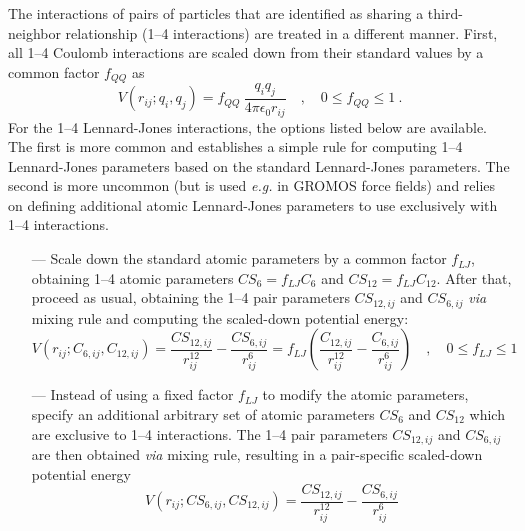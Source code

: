 \documentclass[10pt,a4paper,openany]{memoir}
\numberwithin{equation}{section}
\begin{document}
The interactions of pairs of particles that are identified as sharing
a third-neighbor relationship (1--4 interactions) are treated in a
different manner. First, all 1--4 Coulomb interactions are scaled down from
their standard values by a common factor $f_{QQ}$ as
\begin{equation}
  \label{eq:fudge-QQ}
    V(r_{ij};q_i,q_j) = f_{QQ}\ \frac{q_i q_j}{4\pi\epsilon_0 r_{ij}} \quad , \quad 0 \leq f_{QQ} \leq 1\ .
\end{equation}
For the 1--4 Lennard-Jones interactions, the options listed below are available.
The first is more common and establishes a simple rule for computing 1--4 Lennard-Jones parameters based on the standard Lennard-Jones parameters.
The second is more uncommon (but is used \textit{e.g.} in GROMOS force fields) and relies on defining additional atomic Lennard-Jones parameters to use exclusively with 1--4 interactions. 
\begin{itemize}
\item [---] Scale down the standard atomic parameters by a common factor $f_{LJ}$, obtaining 1--4 atomic parameters $CS_{6} = f_{LJ}C_{6}$ and $CS_{12} = f_{LJ}C_{12}$. After that, proceed as usual, obtaining the 1--4 pair parameters $CS_{12,ij}$ and $CS_{6,ij}$ \textit{via} mixing rule and computing the scaled-down potential energy:
  \begin{equation}
    \label{eq:fudge-LJ}
    V(r_{ij};C_{6,ij},C_{12,ij}) =   \frac{CS_{12,ij}}{r_{ij}^{12}} - \frac{CS_{6,ij}}{r_{ij}^6} = f_{LJ} \left( \frac{C_{12,ij}}{r_{ij}^{12}} - \frac{C_{6,ij}}{r_{ij}^6} \right) \quad , \quad 0 \leq f_{LJ} \leq 1
  \end{equation}
\item [---] Instead of using a fixed factor $f_{LJ}$ to modify the atomic parameters, specify an additional arbitrary set of atomic parameters $CS_6$ and $CS_{12}$ which are exclusive to 1--4 interactions. The 1--4 pair parameters $CS_{12,ij}$ and $CS_{6,ij}$ are then obtained \textit{via} mixing rule, resulting in a pair-specific scaled-down potential energy
    \begin{equation}
    \label{eq:atomic-LJ}
    V(r_{ij};CS_{6,ij},CS_{12,ij}) =  \frac{CS_{12,ij}}{r_{ij}^{12}} - \frac{CS_{6,ij}}{r_{ij}^6} 
  \end{equation}
\end{itemize}
\end{document}
